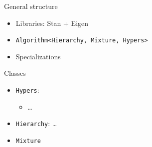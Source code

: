 \begin{frame}{General structure}
\begin{itemize}
		\item Libraries: Stan + Eigen
		\item \texttt{Algorithm<Hierarchy, Mixture, Hypers>}
		\item Specializations
	\end{itemize}
\end{frame}


\begin{frame}{Classes}
	\begin{itemize}
		\item \texttt{Hypers}:
		\begin{itemize}
			\item \dots
		\end{itemize}
		\item \texttt{Hierarchy}: \dots
		\item \texttt{Mixture}
	\end{itemize}
\end{frame}


